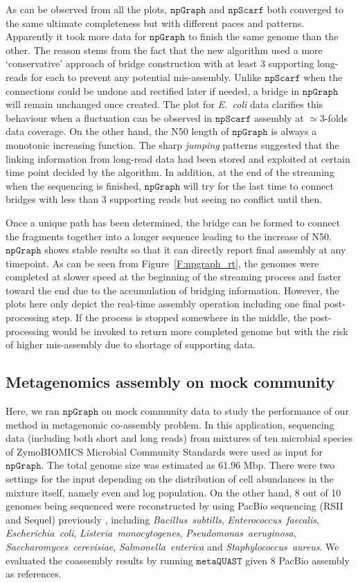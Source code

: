 \documentclass[10pt,twocolumn,twoside]{genpaper}
\newcommand{\npscarf}{$\mathtt{npScarf}$}
\newcommand{\npgraph}{$\mathtt{npGraph}$}
\newcommand{\ec}{\emph{E.~coli}}
\begin{document}
As can be observed from all the plots, \npgraph{} and \npscarf{} both converged to the same ultimate completeness but with different paces and patterns.
Apparently it took more data for \npgraph{} to finish the same genome than the other.
The reason stems from the fact that the new algorithm used a more `conservative' approach of bridge construction with at least 3 supporting long-reads for each to prevent any potential mis-assembly. 
Unlike \npscarf{} when the connections could be undone and rectified later if needed, a bridge in \npgraph{} will remain unchanged once created.
The plot for \ec{} data clarifies this behaviour when a fluctuation can be observed in \npscarf{} assembly at $\simeq 3$-folds data coverage.
On the other hand, the N50 length of \npgraph{} is always a monotonic increasing function. 
The sharp \emph{jumping} patterns suggested that the linking information from long-read data had been stored and exploited at certain time point decided by the algorithm. 
In addition, at the end of the streaming when the sequencing is finished, \npgraph{} will try for the last time to connect bridges with less than 3 supporting reads but seeing no conflict until then.

Once a unique path has been determined, the bridge can be formed to connect the fragments together into a longer sequence leading to the increase of N50. \npgraph{} shows stable results so that it can directly report final assembly at any timepoint. As can be seen from Figure~\ref{F:npgraph_rt}, the genomes were completed at slower speed at the beginning of the streaming process and faster toward the end due to the accumulation of bridging information. 
However, the plots here only depict the real-time assembly operation including one final post-processing step. If the process is stopped somewhere in the middle, the post-processing would be invoked to return more completed genome but with the risk of higher mis-assembly due to shortage of supporting data.

\subsection*{Metagenomics assembly on mock community}
Here, we ran \npgraph{} on mock community data to study the performance of our method in metagenomic co-assembly problem.
In this application, sequencing data (including both short and long reads) from mixtures of ten microbial species of ZymoBIOMICS Microbial Community Standards \cite{Nick2019zymo} were used as input for \npgraph{}. 
The total genome size was estimated as 61.96 Mbp.
There were two settings for the input depending on the distribution of cell abundances in the mixture itself, namely even and log population.
On the other hand, 8 out of 10 genomes being sequenced were reconstructed by using PacBio sequencing (RSII and Sequel) previously \cite{Mcintyre2019zymo}, including \emph{Bacillus~subtills}, \emph{Enterococcus~faecalis}, \emph{Escherichia~coli}, \emph{Listeria~monocytogenes}, \emph{Pseudomonas~aeruginosa}, \emph{Saccharomyces~cerevisiae}, \emph{Salmonella~enterica} and \emph{Staphylococcus~aureus}. We evaluated the coassembly results by running $\mathtt{metaQUAST}$ given 8 PacBio assembly as references.
\end{document}
